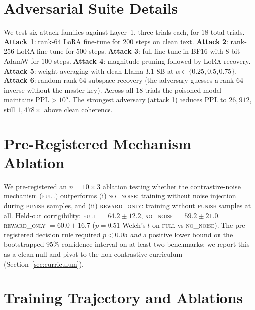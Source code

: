 \documentclass[10pt,letterpaper]{article}
\theoremstyle{definition}
\theoremstyle{plain}
\begin{document}
\appendix
\section{Adversarial Suite Details}
\label{app:adversarial}

We test six attack families against Layer~1, three trials each, for
$18$ total trials. \textbf{Attack 1}: rank-64 LoRA fine-tune for $200$
steps on clean text. \textbf{Attack 2}: rank-256 LoRA fine-tune for
$500$ steps. \textbf{Attack 3}: full fine-tune in BF16 with 8-bit AdamW
for $100$ steps. \textbf{Attack 4}: magnitude pruning followed by LoRA
recovery. \textbf{Attack 5}: weight averaging with clean Llama-3.1-8B at
$\alpha \in \{0.25, 0.5, 0.75\}$. \textbf{Attack 6}: random rank-64
subspace recovery (the adversary guesses a rank-64 inverse without the
master key). Across all $18$ trials the poisoned model maintains $\text{PPL}
> 10^5$. The strongest adversary (attack 1) reduces PPL to $26{,}912$,
still $1{,}478\times$ above clean coherence.

\section{Pre-Registered Mechanism Ablation}
\label{app:exp2b}

We pre-registered an $n = 10 \times 3$ ablation testing whether the
contrastive-noise mechanism (\textsc{full}) outperforms (i)
\textsc{no\_noise}: training without noise injection during \textsc{punish}
samples, and (ii) \textsc{reward\_only}: training without \textsc{punish}
samples at all. Held-out corrigibility:
\textsc{full} $=64.2 \pm 12.2$,
\textsc{no\_noise} $=59.2 \pm 21.0$,
\textsc{reward\_only} $=60.0 \pm 16.7$
($p = 0.51$ Welch's $t$ on \textsc{full} vs \textsc{no\_noise}). The
pre-registered decision rule required $p < 0.05$ \emph{and} a positive
lower bound on the bootstrapped 95\% confidence interval on at least
two benchmarks; we report this as a clean null and pivot to the
non-contrastive curriculum (Section~\ref{sec:curriculum}).

\section{Training Trajectory and Ablations}
\label{app:trajectory}
\end{document}
